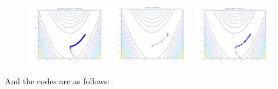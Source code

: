 \documentclass[10pt]{article}
\begin{document}
\begin{figure}[htbp]
	\centering
	\includegraphics[width=0.32\textwidth]{../code/result/gradient_descent.png}
	\includegraphics[width=0.32\textwidth]{../code/result/Newton_method.png}
	\includegraphics[width=0.32\textwidth]{../code/result/Quasi_Newton_method.png}
\end{figure}



And the codes are as follows:\\


	











\end{document}
